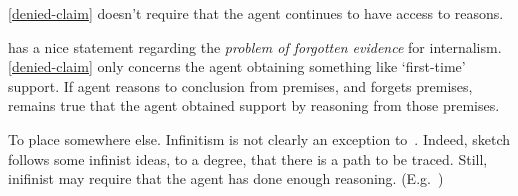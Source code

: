 \begin{note}[Memory]
  \ref{denied-claim} doesn't require that the agent continues to have access to reasons.

  \textcite[208]{Goldman:1999tr} has a nice statement regarding the \emph{problem of forgotten evidence} for internalism.
  \ref{denied-claim} only concerns the agent obtaining something like `first-time' support.
  If agent reasons to conclusion from premises, and forgets premises, remains true that the agent obtained support by reasoning from those premises.
\end{note}


\begin{note}
  {
    \color{red}
    To place somewhere else.
  }
  Infinitism is not clearly an exception to~\uRa{}.
  Indeed, sketch follows some infinist ideas, to a degree, that there is a path to be traced.
  Still, inifinist may require that the agent has done enough reasoning.
  (E.g.\ \textcite[10]{Klein:2007ve})
\end{note}